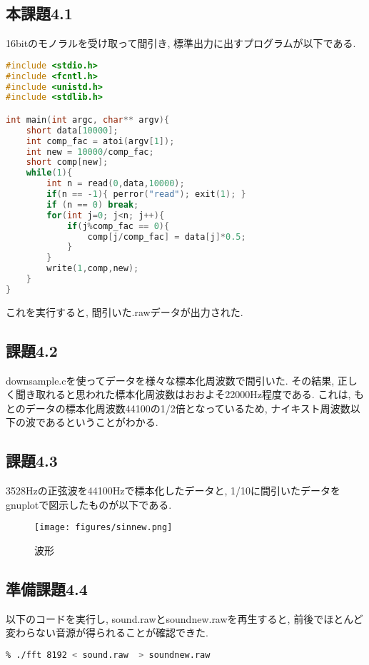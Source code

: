 \documentclass{ltjsarticle}
\begin{document}
\subsection{本課題4.1}
16bitのモノラルを受け取って間引き, 標準出力に出すプログラムが以下である. 
\begin{lstlisting}[caption=downsample.c,language=C]
#include <stdio.h>
#include <fcntl.h>
#include <unistd.h>
#include <stdlib.h>

int main(int argc, char** argv){
    short data[10000];
    int comp_fac = atoi(argv[1]);
    int new = 10000/comp_fac;
    short comp[new];
    while(1){
        int n = read(0,data,10000);
        if(n == -1){ perror("read"); exit(1); }
        if (n == 0) break;
        for(int j=0; j<n; j++){
            if(j%comp_fac == 0){
                comp[j/comp_fac] = data[j]*0.5;
            }
        }
        write(1,comp,new);
    }
}
\end{lstlisting}
これを実行すると, 間引いた.rawデータが出力された. 

\subsection{課題4.2}
downsample.cを使ってデータを様々な標本化周波数で間引いた. その結果, 正しく聞き取れると思われた標本化周波数はおおよそ22000Hz程度である. これは, もとのデータの標本化周波数44100の1/2倍となっているため, ナイキスト周波数以下の波であるということがわかる. 

\subsection{課題4.3}
3528Hzの正弦波を44100Hzで標本化したデータと, 1/10に間引いたデータをgnuplotで図示したものが以下である. 
\begin{figure}[H]
  \begin{center}
    \texttt{[image: figures/sinnew.png]}
    \caption{波形}
  \end{center}
\end{figure}

\subsection{準備課題4.4}
以下のコードを実行し, sound.rawとsoundnew.rawを再生すると, 前後でほとんど変わらない音源が得られることが確認できた. 
\begin{lstlisting}[caption=FFT,language=bash]
% gcc fft.c -o fft
% ./fft 8192 < sound.raw  > soundnew.raw
\end{lstlisting}
\end{document}
